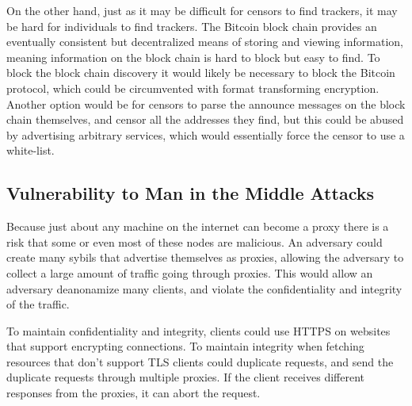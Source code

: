 On the other hand, just as it may be difficult for censors to find trackers, it may be hard for individuals to find trackers. The Bitcoin block chain provides an eventually consistent but decentralized means of storing and viewing information, meaning information on the block chain is hard to block but easy to find. To block the block chain discovery it would likely be necessary to block the Bitcoin protocol, which could be circumvented with format transforming encryption. Another option would be for censors to parse the announce messages on the block chain themselves, and censor all the addresses they find, but this could be abused by advertising arbitrary services, which would essentially force the censor to use a white-list.

\subsection{Vulnerability to Man in the Middle Attacks}

Because just about any machine on the internet can become a proxy there is a risk that some or even most of these nodes are malicious. An adversary could create many sybils that advertise themselves as proxies, allowing the adversary to collect a large amount of traffic going through proxies. This would allow an adversary deanonamize many clients, and violate the confidentiality and integrity of the traffic.

To maintain confidentiality and integrity, clients could use HTTPS on websites that support encrypting connections. To maintain integrity when fetching resources that don't support TLS clients could duplicate requests, and send the duplicate requests through multiple proxies. If the client receives different responses from the proxies, it can abort the request.